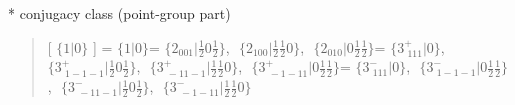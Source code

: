 \documentclass[fleqn,10pt,landscape]{jsarticle}
\begin{document}
* conjugacy class (point-group part)
\begin{quote}
[ $\{1|0\}$ ] = \quad $\{1|0\}$ = \quad $\{2{}_{001}|\frac{1}{2} 0 \frac{1}{2}\}$,\,\, $\{2{}_{100}|\frac{1}{2} \frac{1}{2} 0\}$,\,\, $\{2{}_{010}|0 \frac{1}{2} \frac{1}{2}\}$\newline[ $\{3^{+}_{\,\,111}|0\}$ ] = \quad $\{3^{+}_{\,\,111}|0\}$,\,\, $\{3^{+}_{\,\,1-1-1}|\frac{1}{2} 0 \frac{1}{2}\}$,\,\, $\{3^{+}_{\,\,-11-1}|\frac{1}{2} \frac{1}{2} 0\}$,\,\, $\{3^{+}_{\,\,-1-11}|0 \frac{1}{2} \frac{1}{2}\}$\newline[ $\{3^{-}_{\,\,111}|0\}$ ] = \quad $\{3^{-}_{\,\,111}|0\}$,\,\, $\{3^{-}_{\,\,1-1-1}|0 \frac{1}{2} \frac{1}{2}\}$,\,\, $\{3^{-}_{\,\,-11-1}|\frac{1}{2} 0 \frac{1}{2}\}$,\,\, $\{3^{-}_{\,\,-1-11}|\frac{1}{2} \frac{1}{2} 0\}$\newline
\end{quote}
\end{document}
